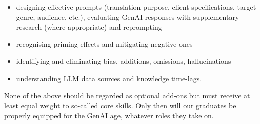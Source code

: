 \documentclass[output=paper]{langscibook}
\begin{document}
\begin{itemize}
\item designing effective prompts (translation purpose, client specifications, target genre, audience, etc.), evaluating GenAI responses with supplementary research (where appropriate) and reprompting
\item recognising priming effects and mitigating negative ones
\item identifying and eliminating bias, additions, omissions, hallucinations
\item understanding LLM data sources and knowledge time-lags.
\end{itemize}

None of the above should be regarded as optional add-ons but must receive at least equal weight to so-called core skills. Only then will our graduates be properly equipped for the GenAI age, whatever roles they take on.


\sloppy\printbibliography[heading=subbibliography,notkeyword=this]
\end{document}
